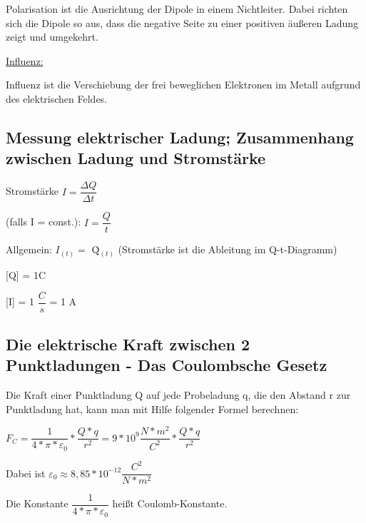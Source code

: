 \vspace{2mm}
Polarisation ist die Ausrichtung der Dipole in einem Nichtleiter. Dabei richten sich die Dipole so aus, dass die negative Seite zu einer positiven äußeren Ladung zeigt und umgekehrt.

\vspace{2mm}
\underline{Influenz:}

\vspace{2mm}
Influenz ist die Verschiebung der frei beweglichen Elektronen im Metall aufgrund des elektrischen Feldes.

\newpage
\subsection{Messung elektrischer Ladung; Zusammenhang zwischen Ladung und Stromstärke}

\vspace{2mm}
Stromstärke $ I = \dfrac{\Delta Q}{\Delta t} $

\vspace{2mm}
(falls I = const.): $ I = \dfrac{Q}{t} $

\vspace{2mm}
Allgemein: $ I_{(t)} = $ \.{Q}$_{(t)} $ (Stromstärke ist die Ableitung im Q-t-Diagramm)

\vspace{2mm}
[Q] = 1C

\vspace{3mm}
[I] = 1 $ \dfrac{C}{s} $ = 1 A

\vspace{10mm}
\subsection{Die elektrische Kraft zwischen 2 Punktladungen - Das Coulombsche Gesetz}
Die Kraft einer Punktladung Q auf jede Probeladung q, die den Abstand r zur Punktladung hat, kann man mit Hilfe folgender Formel berechnen:

\vspace{3mm}
$ F_{C} = \dfrac{1}{4 \ast \pi \ast \varepsilon _{0} } \ast \dfrac{Q \ast q}{r^{2}} = 9 \ast 10^{9} \dfrac{N \ast m^{2}}{C^{2}} \ast \dfrac{Q \ast q}{r^{2}} $

\vspace{3mm}
Dabei ist $ \varepsilon_{0} \approx 8,85 \ast 10^{-12} \dfrac{C^{2}}{N \ast m^{2}} $

\vspace{3mm}
Die Konstante $ \dfrac{1}{4 \ast \pi \ast \varepsilon _{0} } $ heißt Coulomb-Konstante.


